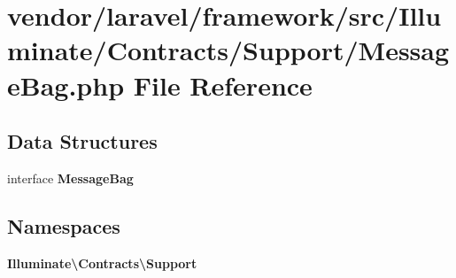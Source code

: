 \section{vendor/laravel/framework/src/\+Illuminate/\+Contracts/\+Support/\+Message\+Bag.php File Reference}
\label{_contracts_2_support_2_message_bag_8php}
\subsection*{Data Structures}
\begin{DoxyCompactItemize}
\item 
interface {\bf Message\+Bag}
\end{DoxyCompactItemize}
\subsection*{Namespaces}
\begin{DoxyCompactItemize}
\item 
 {\bf Illuminate\textbackslash{}\+Contracts\textbackslash{}\+Support}
\end{DoxyCompactItemize}

